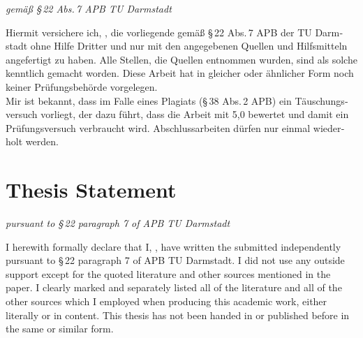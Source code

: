 


\begingroup

\begin{otherlanguage}{ngerman}
\begin{flushright}
	\emph{gemäß §\,22 Abs.\,7 APB TU Darmstadt}
\end{flushright}
Hiermit versichere ich, \myName{}, die vorliegende \myDegree{} gemäß §\,22 Abs.\,7 APB der TU Darmstadt ohne Hilfe Dritter und nur mit den angegebenen Quellen und Hilfsmitteln angefertigt zu haben. Alle Stellen, die Quellen entnommen wurden, sind als solche kenntlich gemacht worden. Diese Arbeit hat in gleicher oder ähnlicher Form noch keiner Prüfungsbehörde vorgelegen. \\

\noindent Mir ist bekannt, dass im Falle eines Plagiats (§\,38 Abs.\,2 APB) ein Täuschungsversuch vorliegt, der dazu führt, dass die Arbeit mit 5,0 bewertet und damit ein Prüfungsversuch verbraucht wird. Abschlussarbeiten dürfen nur einmal wiederholt werden.
\end{otherlanguage}

\vfill

\let\cleardoublepage\relax
\chapter*{Thesis Statement}
\begin{flushright}
	\emph{pursuant to §\,22 paragraph 7 of APB TU Darmstadt}
\end{flushright}

\noindent I herewith formally declare that I, \myName{}, have written the submitted \myDegree{} independently pursuant to §\,22 paragraph 7 of APB TU Darmstadt. I did not use any outside support except for the quoted literature and other sources mentioned in the paper. I clearly marked and separately listed all of the literature and all of the other sources which I employed when producing this academic work, either literally or in content. This thesis has not been handed in or published before in the same or similar form. \\

